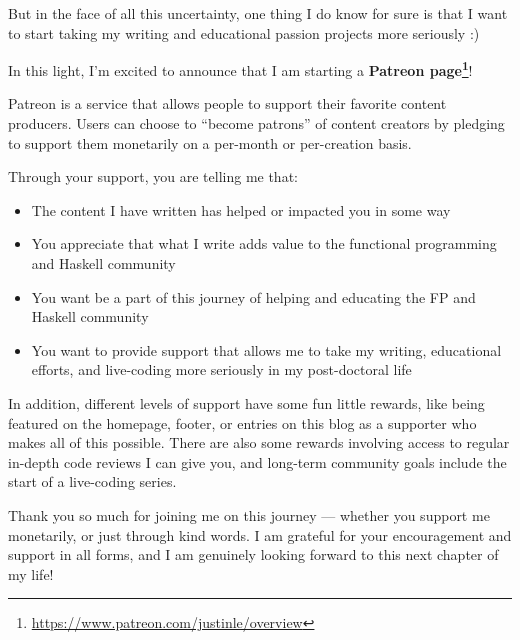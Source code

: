 \documentclass[]{article}
\renewcommand{\href}[2]{#2\footnote{\url{#1}}}
\begin{document}
But in the face of all this uncertainty, one thing I do know for sure is that I
want to start taking my writing and educational passion projects more seriously
:)

In this light, I'm excited to announce that I am starting a
\textbf{\href{https://www.patreon.com/justinle/overview}{Patreon page}}!

Patreon is a service that allows people to support their favorite content
producers. Users can choose to ``become patrons'' of content creators by
pledging to support them monetarily on a per-month or per-creation basis.

Through your support, you are telling me that:

\begin{itemize}
\tightlist
\item
  The content I have written has helped or impacted you in some way
\item
  You appreciate that what I write adds value to the functional programming and
  Haskell community
\item
  You want be a part of this journey of helping and educating the FP and Haskell
  community
\item
  You want to provide support that allows me to take my writing, educational
  efforts, and live-coding more seriously in my post-doctoral life
\end{itemize}

In addition, different levels of support have some fun little rewards, like
being featured on the homepage, footer, or entries on this blog as a supporter
who makes all of this possible. There are also some rewards involving access to
regular in-depth code reviews I can give you, and long-term community goals
include the start of a live-coding series.

Thank you so much for joining me on this journey --- whether you support me
monetarily, or just through kind words. I am grateful for your encouragement and
support in all forms, and I am genuinely looking forward to this next chapter of
my life!
\end{document}
